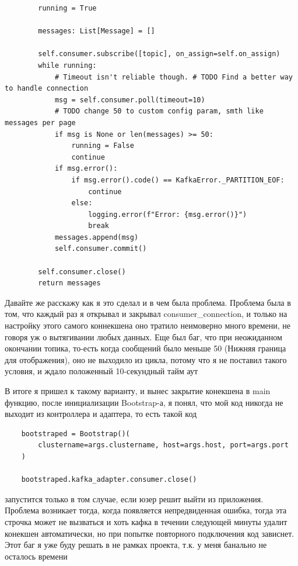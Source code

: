 \documentclass[10pt , a4paper]{report}
\newenvironment{code}{\captionsetup{type=listing}}{}
\begin{document}
\begin{code}
\begin{verbatim}
        running = True

        messages: List[Message] = []

        self.consumer.subscribe([topic], on_assign=self.on_assign)
        while running:
            # Timeout isn't reliable though. # TODO Find a better way to handle connection
            msg = self.consumer.poll(timeout=10)
            # TODO change 50 to custom config param, smth like messages per page
            if msg is None or len(messages) >= 50:
                running = False
                continue
            if msg.error():
                if msg.error().code() == KafkaError._PARTITION_EOF:
                    continue
                else:
                    logging.error(f"Error: {msg.error()}")
                    break
            messages.append(msg)
            self.consumer.commit()

        self.consumer.close()
        return messages
  \end{verbatim}
\end{code}

Давайте же расскажу как я это сделал и в чем была проблема. Проблема была в том, что каждый раз я открывал и закрывал consumer\_connection, и только на настройку этого самого коннекшена оно тратило неимоверно много времени, не говоря уж о вытягивании любых данных. Еще был баг, что при неожиданном окончании топика, то-есть когда сообщений было меньше 50 (Нижняя граница для отображения), оно не выходило из цикла, потому что я не поставил такого условия, и ждало положенный 10-секундный тайм аут 

В итоге я пришел к такому варианту, и вынес закрытие конекшена в main функцию, после инициализации Bootstrap-а, я понял, что мой код никогда не выходит из контроллера и адаптера, то есть такой код

\begin{code}
  \begin{verbatim}
    bootstraped = Bootstrap()(
        clustername=args.clustername, host=args.host, port=args.port
    )

    bootstraped.kafka_adapter.consumer.close()
  \end{verbatim}
\end{code}

запустится только в том случае, если юзер решит выйти из приложения. Проблема возникает тогда, когда появляется непредвиденная ошибка, тогда эта строчка может не вызваться и хоть кафка в течении следующей минуты удалит конекшен автоматически, но при попытке повторного подключения код зависнет. Этот баг я уже буду решать в не рамках проекта, т.к. у меня банально не осталось времени
\end{document}
